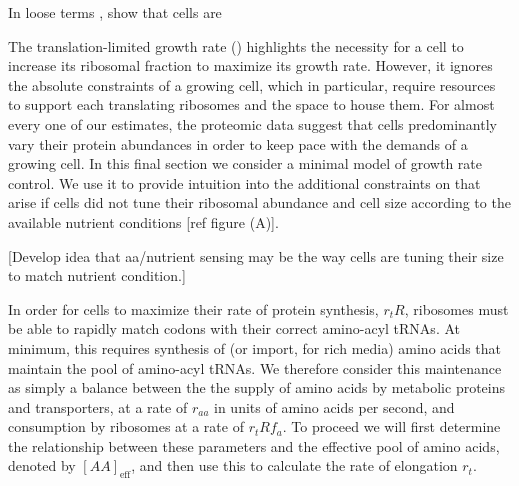 In loose terms , show that cells are


The translation-limited growth rate ()
highlights the necessity for a cell to increase its ribosomal fraction to
maximize its growth rate. However, it ignores the absolute constraints of a
growing cell, which in particular, require resources to support each translating
ribosomes and the space to house them. For almost every one of our estimates,
the proteomic data suggest that cells predominantly vary their protein
abundances in order to keep pace with the demands of a growing cell. In this
final section we consider a minimal model of growth rate control. We use it to
provide intuition into the additional constraints on that arise if cells did not
tune their ribosomal abundance and cell size according to the available nutrient
conditions [ref figure (A)].


[Develop idea that aa/nutrient sensing may be the way cells are tuning their size to
match nutrient condition.]

In order for cells to maximize their rate of protein synthesis, $r_t R$,
ribosomes must be able to rapidly match codons with their correct amino-acyl
tRNAs. At minimum, this requires synthesis of (or import, for rich media) amino
acids that maintain the pool of amino-acyl tRNAs. We therefore consider this
maintenance as simply a balance between the the supply of amino acids by
metabolic proteins and transporters, at a rate of $r_{aa}$ in units of amino
acids per second, and consumption by ribosomes at a rate of $r_t R f_a$.
To proceed we will first determine the
relationship between these parameters and the effective pool of amino acids,
denoted by $[AA]_{\text{eff}}$, and then use this to calculate the rate of
elongation $r_t$.


